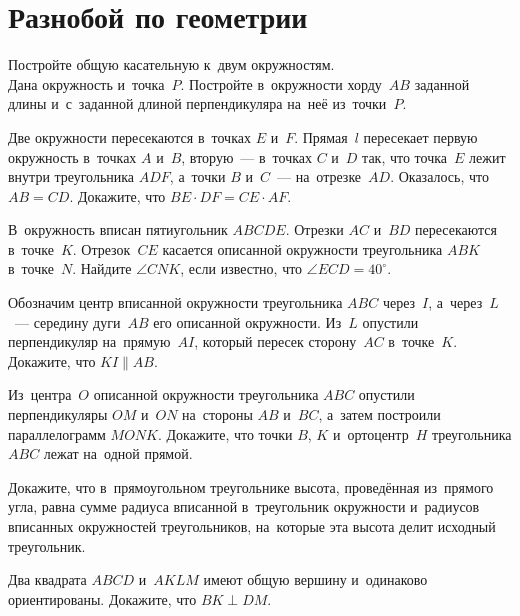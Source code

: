 
\section*{Разнобой по геометрии}


\begin{problems}

\item
\sp
Постройте общую касательную к~двум окружностям.
\\
\sp Дана окружность и~точка~$P$.
Постройте в~окружности хорду~$AB$ заданной длины и~с~заданной длиной
перпендикуляра на~неё из~точки~$P$.

\item
Две окружности пересекаются в~точках $E$ и~$F$.
Прямая~$l$ пересекает первую окружность в~точках $A$ и~$B$, вторую~---
в~точках $C$ и~$D$ так, что точка~$E$ лежит внутри треугольника $ADF$,
а~точки $B$ и~$C$~--- на~отрезке~$AD$.
Оказалось, что $AB = CD$.
Докажите, что $BE \cdot DF = CE \cdot AF$.

\item
В~окружность вписан пятиугольник $ABCDE$.
Отрезки $AC$ и~$BD$ пересекаются в~точке~$K$.
Отрезок~$CE$ касается описанной окружности треугольника $ABK$ в~точке~$N$.
Найдите $\angle CNK$, если известно, что $\angle ECD = 40^\circ$.

\item
Обозначим центр вписанной окружности треугольника $ABC$ через~$I$,
а~через~$L$~--- середину дуги~$AB$ его описанной окружности.
Из~$L$ опустили перпендикуляр на~прямую~$AI$, который пересек сторону~$AC$
в~точке~$K$.
Докажите, что $KI \parallel AB$.

\item
Из~центра~$O$ описанной окружности треугольника $ABC$ опустили перпендикуляры
$OM$ и~$ON$ на~стороны $AB$ и~$BC$, а~затем построили параллелограмм $MONK$.
Докажите, что точки $B$, $K$ и~ортоцентр~$H$ треугольника $ABC$ лежат
на~одной прямой.

\item
Докажите, что в~прямоугольном треугольнике высота, проведённая из~прямого угла,
равна сумме радиуса вписанной в~треугольник окружности и~радиусов вписанных
окружностей треугольников, на~которые эта высота делит исходный треугольник.

\item
Два квадрата $ABCD$ и~$AKLM$ имеют общую вершину и~одинаково ориентированы.
Докажите, что $BK \perp DM$.

\end{problems}

